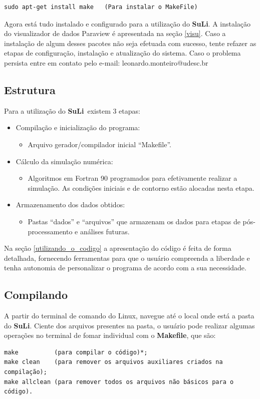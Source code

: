 \documentclass[12pt, a4paper]{article}
\newcommand{\SL}{{\bf SuLi}}
\begin{document}
\begin{verbatim}
sudo apt-get install make	(Para instalar o MakeFile)
\end{verbatim}

Agora está tudo instalado e configurado para a utilização do \SL. A instalação do visualizador de dados Paraview é apresentada na seção \ref{visu}. Caso a instalação de algum desses pacotes não seja efetuada com sucesso, tente refazer as etapas de configuração, instalação e atualização do sistema. Caso o problema persista entre em contato pelo e-mail: leonardo.monteiro@udesc.br

\subsection{Estrutura}
Para a utilização do \SL\ existem 3 etapas:
\begin{itemize}
	\item Compilação e inicialização do programa:
		\begin{itemize}
			\item Arquivo gerador/compilador inicial ``Makefile''.
		\end{itemize}
	\item Cálculo da simulação numérica:
		\begin{itemize}
			\item Algoritmos em Fortran 90 programados para efetivamente realizar a simulação. As condições iniciais e de contorno estão alocadas nesta etapa.
		\end{itemize}
	\item Armazenamento dos dados obtidos:
		\begin{itemize}
			\item Pastas ``dados'' e ``arquivos'' que armazenam os dados para etapas de pós-processamento e análises futuras.
		\end{itemize}
\end{itemize}

Na seção \ref{utilizando_o_codigo} a apresentação do código é feita de forma detalhada, fornecendo ferramentas para que o usuário compreenda a liberdade e tenha autonomia de personalizar o programa de acordo com a sua necessidade.

\subsection{Compilando}
A partir do terminal de comando do Linux, navegue até o local onde está a pasta do \SL . Ciente dos arquivos presentes na pasta, o usuário pode realizar algumas operações no terminal de fomar individual com o {\bf{Makefile}}, que são:
\label{limpar_dados}
\begin{verbatim}
make          (para compilar o código)*; 
make clean    (para remover os arquivos auxiliares criados na compilação);
make allclean (para remover todos os arquivos não básicos para o código).
\end{verbatim} 
\end{document}
